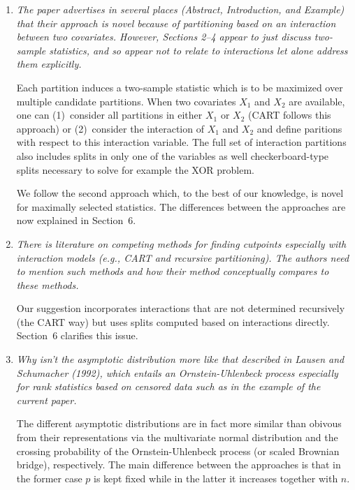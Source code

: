 \documentclass[11pt,a4paper]{article}
\begin{document}
\begin{enumerate}

  \item \textit{The paper advertises in several places (Abstract,
        Introduction, and Example) that their approach is novel because
	of partitioning based on an interaction between two covariates.
	However, Sections 2--4 appear to just discuss two-sample statistics,
	and so appear not to relate to interactions let alone address them
	explicitly.}
	
        Each partition induces a two-sample statistic which is to be maximized
        over multiple candidate partitions. When two covariates $X_1$ and $X_2$ are available,
        one can (1)~consider all partitions in either $X_1$ or $X_2$ (CART follows
        this approach) or (2)~consider the interaction of $X_1$ and $X_2$ 
        and define paritions with respect to this interaction variable. The full set
	of interaction partitions also includes splits in only one of the variables
        as well checkerboard-type splits necessary to solve for example the XOR problem.

        We follow the second approach which, to the best of our knowledge, is novel
	for maximally selected statistics.
        The differences between the approaches are now explained in Section~6.
	
  \item \textit{There is literature on competing methods for finding cutpoints
        especially with interaction models (e.g., CART and recursive partitioning).
	The authors need to mention such methods and how their method conceptually
	compares to these methods.}
	
	Our suggestion incorporates interactions that 
        are not determined recursively (the CART way) but uses splits computed based on 
	interactions directly. Section~6 clarifies this issue.

  \item \textit{Why isn't the asymptotic distribution more like that described
        in Lausen and Schumacher (1992), which entails an Ornstein-Uhlenbeck process
	especially for rank statistics based on censored data such as in the example
	of the current paper.}
	
        The different asymptotic distributions are in fact more similar than obivous
	from their representations via the multivariate normal distribution and the
	crossing probability of the Ornstein-Uhlenbeck process (or scaled Brownian
	bridge), respectively. The main difference between the approaches is that
	in the former case $p$ is kept fixed while in the latter it increases
	together with $n$.
	

\end{enumerate}
\end{document}
